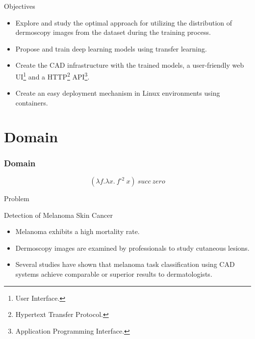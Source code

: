 \documentclass[dvipsnames,mathserif]{beamer}
\begin{document}
{    \begin{frame}
      \large Objectives
      \vspace{0.25cm}

      \footnotesize
      \begin{itemize}
        \item Explore and study the optimal approach for utilizing the distribution
          of dermoscopy images from the dataset during the training process.
        \item Propose and train deep learning models using transfer learning.
        \item Create the CAD infrastructure with the trained models, a
          user-friendly web UI\footnote{User Interface.} and a
          HTTP\footnote{Hypertext Transfer Protocol.}
          API\footnote{Application Programming Interface.}.
        \item Create an easy deployment mechanism in Linux environments using containers.
      \end{itemize}


    \end{frame}

    \section{Domain}

    \begin{frame}
      \frametitle{Domain}

      \[(\lambda f. \lambda x.\ f^{\circ 2}\ x)\ succ\ zero\]
    \end{frame}

    \begin{frame}
      \begin{center}
        \Huge Problem
      \end{center}
    \end{frame}


    \begin{frame}
      \large Detection of Melanoma Skin Cancer
      \vspace{0.25cm}

      \footnotesize
      \begin{itemize}
        \item Melanoma exhibits a high mortality rate.
        \item Dermoscopy images are examined by professionals to study cutaneous lesions.
        \item Several studies have shown that melanoma task classification
          using CAD systems achieve comparable or superior results to
          dermatologists.
      \end{itemize}



\end{frame}}
\end{document}
